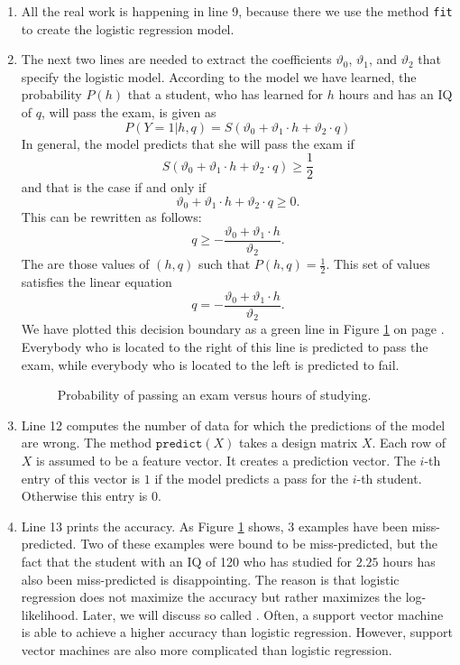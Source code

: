 \begin{enumerate}
\begin{enumerate}
      \end{enumerate}
\item All the real work is happening in line 9, because there we use the method \texttt{fit} to create the
      logistic regression model.
\item The next two lines are needed to extract the coefficients $\vartheta_0$, $\vartheta_1$, and $\vartheta_2$
      that specify the logistic model.      
      According to the model we have learned, the probability $P(h)$ that a student, who has learned for $h$
      hours and has an IQ of $q$, will pass the exam, is given as 
      $$ P(Y=1|h,q) = S(\vartheta_0 + \vartheta_1 \cdot h + \vartheta_2 \cdot q) $$
      In general, the model predicts that she will pass the exam if
      $$ S(\vartheta_0 + \vartheta_1 \cdot h + \vartheta_2 \cdot q) \geq \frac{1}{2} $$
      and that is the case if and only if
      $$ \vartheta_0 + \vartheta_1 \cdot h + \vartheta_2 \cdot q \geq 0. $$
      This can be rewritten as follows:
      $$  q \geq -\frac{\vartheta_0 + \vartheta_1 \cdot h}{\vartheta_2}. $$
      The  are those values of $(h, q)$ such that $P(h, q) = \frac{1}{2}$.  This set of
      values satisfies the linear equation
      $$  q = -\frac{\vartheta_0 + \vartheta_1 \cdot h}{\vartheta_2}. $$
      We have plotted this decision boundary as a green line in Figure \ref{fig:exam-iq-boundary.pdf} on page
      \pageref{fig:exam-iq-boundary.pdf}.  Everybody who is located to the right of this line is predicted to pass the exam,
      while everybody who is located to the left is predicted to fail.


\begin{figure}[!th]
\caption{Probability of passing an exam versus hours of studying.}
\label{fig:exam-iq-boundary.pdf}
\end{figure}
\FloatBarrier
\item Line 12 computes the number of data for which the predictions of the model are wrong.
      The method $\texttt{predict}(X)$ takes a design matrix $X$.  Each row of $X$ is assumed to be a feature
      vector. It creates a prediction vector.  The $i$-th entry of this vector is $1$ if the model predicts a
      pass for the $i$-th student.  Otherwise this entry is $0$.
\item Line 13 prints the accuracy.  As Figure \ref{fig:exam-iq-boundary.pdf} shows, 3 examples have been
      miss-predicted.  Two of these examples were bound to be miss-predicted, but the fact that the student
      with an IQ of 120 who has studied for $2.25$ hours has also been miss-predicted is disappointing.
      The reason is that logistic regression does not maximize the accuracy but rather
      maximizes the log-likelihood.  Later, we will discuss so called 
      .  Often, a support vector machine is able to achieve a higher accuracy
      than logistic regression.  However, support vector machines are also more complicated than logistic regression.
 \end{enumerate}
